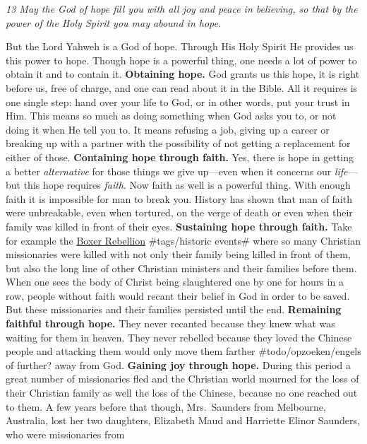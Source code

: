 \emph{13 May the God of hope fill you with all joy and peace in
believing, so that by the power of the Holy Spirit you may abound in
hope.}

But the Lord Yahweh is a God of hope. Through His Holy Spirit He
provides us this power to hope. Though hope is a powerful thing, one
needs a lot of power to obtain it and to contain it. \textbf{Obtaining
hope.} God grants us this hope, it is right before us, free of charge,
and one can read about it in the Bible. All it requires is one single
step: hand over your life to God, or in other words, put your trust in
Him. This means so much as doing something when God asks you to, or not
doing it when He tell you to. It means refusing a job, giving up a
career or breaking up with a partner with the possibility of not getting
a replacement for either of those. \textbf{Containing hope through
faith.} Yes, there is hope in getting a better \emph{alternative} for
those things we give up---even when it concerns our \emph{life}---but
this hope requires \emph{faith}. Now faith as well is a powerful thing.
With enough faith it is impossible for man to break you. History has
shown that man of faith were unbreakable, even when tortured, on the
verge of death or even when their family was killed in front of their
eyes. \textbf{Sustaining hope through faith.} Take for example the
\href{\%5Bhttps://en.wikipedia.org/wiki/Boxer_Rebellion\%5D(https://en.wikipedia.org/wiki/Boxer_Rebellion)}{Boxer
Rebellion} \#tags/historic events\# where so many Christian missionaries
were killed with not only their family being killed in front of them,
but also the long line of other Christian ministers and their families
before them. When one sees the body of Christ being slaughtered one by
one for hours in a row, people without faith would recant their belief
in God in order to be saved. But these missionaries and their families
persisted until the end. \textbf{Remaining faithful through hope.} They
never recanted because they knew what was waiting for them in heaven.
They never rebelled because they loved the Chinese people and attacking
them would only move them farther \#todo/opzoeken/engels of further?
away from God. \textbf{Gaining joy through hope.} During this period a
great number of missionaries fled and the Christian world mourned for
the loss of their Christian family as well the loss of the Chinese,
because no one reached out to them. A few years before that though,
Mrs.~Saunders from Melbourne, Australia, lost her two daughters,
Elizabeth Maud and Harriette Elinor Saunders, who were missionaries from
